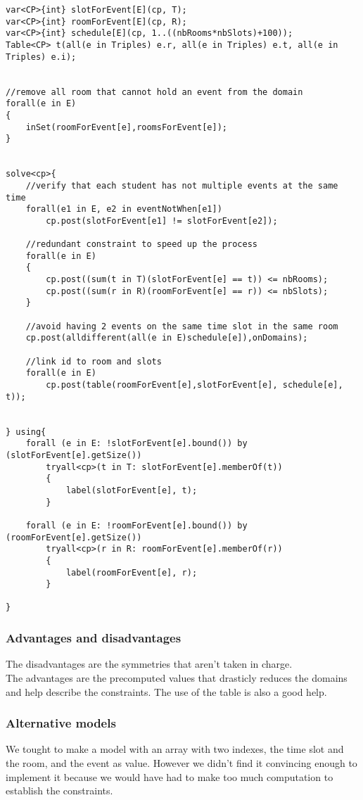 \documentclass{eplDoc}
\begin{document}
\begin{lstlisting}
var<CP>{int} slotForEvent[E](cp, T);
var<CP>{int} roomForEvent[E](cp, R);
var<CP>{int} schedule[E](cp, 1..((nbRooms*nbSlots)+100));
Table<CP> t(all(e in Triples) e.r, all(e in Triples) e.t, all(e in Triples) e.i);


//remove all room that cannot hold an event from the domain
forall(e in E)
{
    inSet(roomForEvent[e],roomsForEvent[e]);
}


solve<cp>{
    //verify that each student has not multiple events at the same time
    forall(e1 in E, e2 in eventNotWhen[e1])
        cp.post(slotForEvent[e1] != slotForEvent[e2]);

    //redundant constraint to speed up the process
    forall(e in E)
    {
        cp.post((sum(t in T)(slotForEvent[e] == t)) <= nbRooms);
        cp.post((sum(r in R)(roomForEvent[e] == r)) <= nbSlots);
    }

    //avoid having 2 events on the same time slot in the same room
    cp.post(alldifferent(all(e in E)schedule[e]),onDomains);

    //link id to room and slots
    forall(e in E)
        cp.post(table(roomForEvent[e],slotForEvent[e], schedule[e], t));


} using{
    forall (e in E: !slotForEvent[e].bound()) by (slotForEvent[e].getSize())
        tryall<cp>(t in T: slotForEvent[e].memberOf(t))
        {
            label(slotForEvent[e], t);
        }
    
    forall (e in E: !roomForEvent[e].bound()) by (roomForEvent[e].getSize())
        tryall<cp>(r in R: roomForEvent[e].memberOf(r))
        {
            label(roomForEvent[e], r);
        }
    
}
\end{lstlisting}

\subsubsection{Advantages and disadvantages}
The disadvantages are the symmetries that aren't taken in charge. \\
The advantages are the precomputed values that drasticly reduces the domains and help describe the constraints.  The use of the table is also a good help.

\subsubsection{Alternative models}
We tought to make a model with an array with two indexes, the time slot and the room, and the event as value. However we didn't find it convincing enough to implement it because we would have had to make too much computation to establish the constraints.
\end{document}
